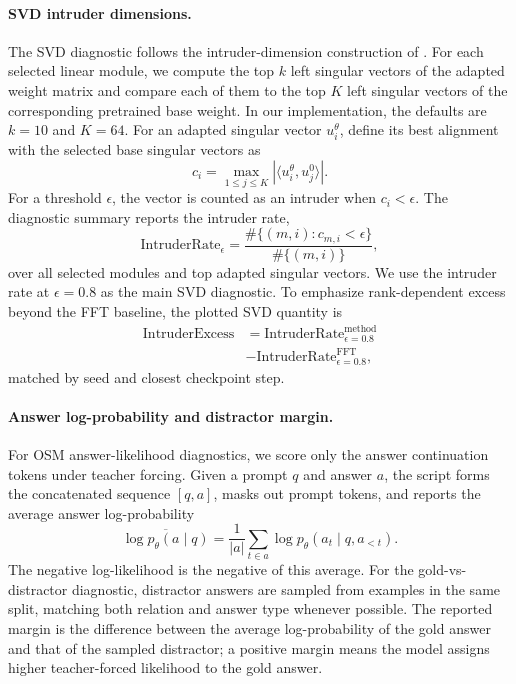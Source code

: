\documentclass[11pt]{article}
\begin{document}
\paragraph{SVD intruder dimensions.}
The SVD diagnostic follows the intruder-dimension construction of
\citet{shuttleworth2024lora}. For each selected linear module, we compute the
top $k$ left singular vectors of the adapted weight matrix and compare each
of them to the top $K$ left singular vectors of the corresponding pretrained
base weight. In our implementation, the defaults are $k=10$ and $K=64$.
For an adapted singular vector $u_i^\theta$, define its best alignment with
the selected base singular vectors as
\[
c_i = \max_{1 \leq j \leq K} |\langle u_i^\theta, u_j^0\rangle|.
\]
For a threshold $\epsilon$, the vector is counted as an intruder when
$c_i < \epsilon$. The diagnostic summary reports the intruder rate,
\[
\mathrm{IntruderRate}_{\epsilon}
=
\frac{\#\{(m,i): c_{m,i}<\epsilon\}}
{\#\{(m,i)\}},
\]
over all selected modules and top adapted singular vectors. 
We use the intruder rate at $\epsilon=0.8$ as the main SVD diagnostic.
To emphasize rank-dependent excess beyond the FFT baseline,
the plotted SVD quantity is
\begin{align*}
\mathrm{IntruderExcess}
&= \mathrm{IntruderRate}^{\mathrm{method}}_{\epsilon=0.8} \\
&- \mathrm{IntruderRate}^{\mathrm{FFT}}_{\epsilon=0.8},
\end{align*}
matched by seed and closest checkpoint step.

\paragraph{Answer log-probability and distractor margin.}
For OSM answer-likelihood diagnostics, we score only the answer continuation
tokens under teacher forcing. Given a prompt \(q\) and answer \(a\), the script
forms the concatenated sequence \([q,a]\), masks out prompt tokens, and reports
the average answer log-probability
\[
\overline{\log p_\theta(a \mid q)}
=
\frac{1}{|a|}
\sum_{t \in a}
\log p_\theta(a_t \mid q, a_{<t}).
\]
The negative log-likelihood is the negative of this average. For the
gold-vs-distractor diagnostic, distractor answers are sampled from examples
in the same split, matching both relation and answer type whenever possible. The reported margin is the
difference between the average log-probability of the gold answer and that of
the sampled distractor; a positive margin means the model assigns higher
teacher-forced likelihood to the gold answer.
\end{document}
